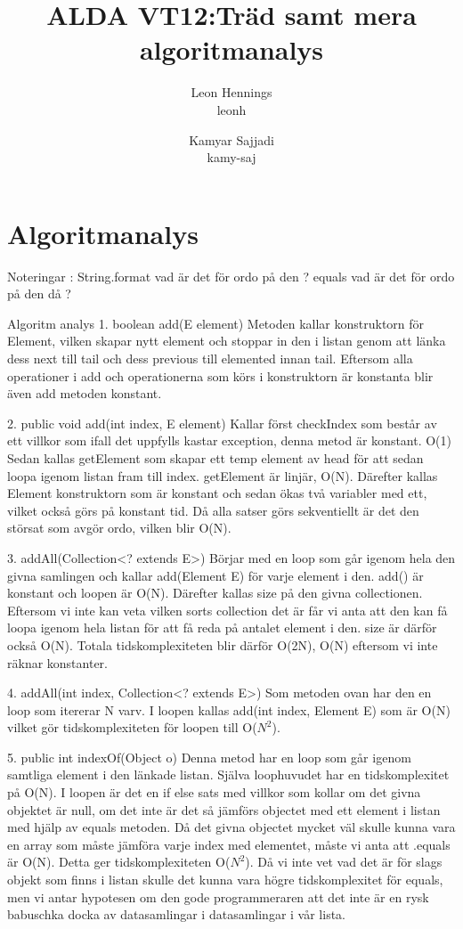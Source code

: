 \documentclass[a4paper,10pt,oneside,onecolumn]{article}
\title{ALDA VT12:Träd samt mera algoritmanalys}
\author{Leon Hennings\\leonh \and Kamyar Sajjadi\\kamy-saj}
\begin{document}
\maketitle

\section{}



\section{Algoritmanalys}
Noteringar :
String.format vad är det för ordo på den ?
equals vad är det för ordo på den då ?

Algoritm analys
1. boolean add(E element)
Metoden kallar konstruktorn för Element, vilken skapar nytt element och stoppar in den i listan genom att länka dess next till tail och dess previous till elemented innan tail.
Eftersom alla operationer i add och operationerna som körs i konstruktorn är konstanta blir även add metoden konstant.

2. public void add(int index, E element)
Kallar först checkIndex som består av ett villkor som ifall det uppfylls kastar exception, denna metod är konstant. O(1)
Sedan kallas getElement som skapar ett temp element av head för att sedan loopa igenom listan fram till index. getElement är linjär, O(N).
Därefter kallas Element konstruktorn som är konstant och sedan ökas två variabler med ett, vilket också görs på konstant tid.
Då alla satser görs sekventiellt är det den störsat som avgör ordo, vilken blir O(N).

3. addAll(Collection<? extends E>)
Börjar med en loop som går igenom hela den givna samlingen och kallar add(Element E) för varje element i den. add() är konstant och loopen är O(N).
Därefter kallas size på den givna collectionen. Eftersom vi inte kan veta vilken sorts collection det är får vi anta att den kan få loopa igenom hela listan för att få reda på antalet element i den.
size är därför också O(N). Totala tidskomplexiteten blir därför O(2N), O(N) eftersom vi inte räknar konstanter.

4. addAll(int index, Collection<? extends E>)
Som metoden ovan har den en loop som itererar N varv. I loopen kallas add(int index, Element E) som är O(N) vilket gör tidskomplexiteten för loopen till O($N^{2}$).

5. public int indexOf(Object o)
Denna metod har en loop som går igenom samtliga element i den länkade listan. Själva loophuvudet har en tidskomplexitet på O(N). I loopen är det en if else sats med villkor som kollar om det givna objektet är null, om det inte är det så jämförs objectet med ett element i listan med hjälp av equals metoden. Då det givna objectet mycket väl skulle kunna vara en array som måste jämföra varje index med elementet, måste vi anta att .equals är O(N).
Detta ger tidskomplexiteten O($N^{2}$).
Då vi inte vet vad det är för slags objekt som finns i listan skulle det kunna vara högre tidskomplexitet för equals, men vi antar hypotesen om den gode programmeraren att det inte är en rysk babuschka docka av datasamlingar i datasamlingar i vår lista.
\end{document}
